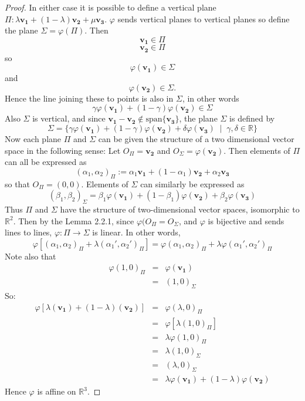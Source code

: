 \documentclass[honours]{UNSWthesis}
\newcommand{\R}{\mathbb{R}}
\newcommand{\1}{\mathbf{e}_{1}}
\newcommand{\2}{\mathbf{e}_{3}}
\newcommand{\3}{\mathbf{e}_{3}}
\begin{document}
\begin{proof}
In either case it is possible to define a vertical plane $\Pi: \lambda \mathbf{v_{1}} + (1-\lambda) \mathbf{v_{2}} + \mu\mathbf{v_{3}}$. $\varphi$ sends vertical planes to vertical planes so define the plane $\Sigma = \varphi(\Pi)$. Then 
\[
\mathbf{v_{1}} \in \Pi
\]
\[
\mathbf{v_{2}} \in \Pi
\]
so 
\[
\varphi(\mathbf{v_{1}}) \in \Sigma
\]
and 
\[
\varphi(\mathbf{v_{2}}) \in \Sigma.
\]
Hence the line joining these to points is also in $\Sigma$, in other words
\[
\gamma \varphi(\mathbf{v_{1}}) + (1-\gamma)\varphi(\mathbf{v_{2}}) \in \Sigma
\]
Also $\Sigma$ is vertical, and since $\mathbf{v_{1}}-\mathbf{v_{2}} \notin \text{span}\{ \mathbf{v_{3}}\}$, the plane $\Sigma$ is defined by 
\[
\Sigma = \{ \gamma \varphi(\mathbf{v_{1}}) + (1-\gamma)\varphi(\mathbf{v_{2}}) + \delta \varphi(\mathbf{v_{3}}) \; \;|\;\; \gamma,\delta \in \R \}
\]
Now each plane $\Pi$ and $\Sigma$ can be given the structure of a two dimensional vector space in the following sense:
Let $O_{\Pi}=\mathbf{v_{2}}$ and $O_{\Sigma}= \varphi(\mathbf{v_{2}})$. Then elements of $\Pi$ can all be expressed as 
\[
(\alpha_{1}, \alpha_{2})_{\Pi}:= \alpha_{1}\mathbf{v_{1}}+(1-\alpha_{1})\mathbf{v_{2}} + \alpha_{2}\mathbf{v_{3}}
\]
so that $O_{\Pi}=(0,0)$. 
Elements of $\Sigma$ can similarly be expressed as
\[
(\beta_{1}, \beta_{2})_{\Sigma}= \beta_{1}\varphi(\mathbf{v_{1}})+(1-\beta_{1})\varphi(\mathbf{v_{2}}) + \beta_{2} \varphi (\mathbf{v_{3}})
\]
Thus $\Pi$ and $\Sigma$ have the structure of two-dimensional vector spaces, isomorphic to $\R^2$. Then by the Lemma 2.2.1, since $\varphi(O_{\Pi}=O_{\Sigma}$, and $\varphi$ is bijective and sends lines to lines, $\varphi:\Pi \longrightarrow \Sigma$ is linear. In other words, 
\[
\varphi[(\alpha_{1},\alpha_{2})_{\Pi}+\lambda(\alpha_{1}',\alpha_{2}')_{\Pi}]=\varphi(\alpha_{1},\alpha_{2})_{\Pi} + \lambda \varphi(\alpha_{1}',\alpha_{2}')_{\Pi}
\]
Note also that 
\begin{eqnarray*}
\varphi(1,0)_{\Pi}&=&\varphi(\mathbf{v_{1}}) \\
&=& (1,0)_{\Sigma}
\end{eqnarray*}
So:
\begin{eqnarray*}
\varphi[\lambda(\mathbf{v_{1}})+(1-\lambda)(\mathbf{v_{2}})] &=& \varphi(\lambda,0)_{\Pi} \\
&=& \varphi[\lambda(1,0)_{\Pi}] \\
&=& \lambda\varphi(1,0)_{\Pi} \\
&=& \lambda(1,0)_{\Sigma} \\
&=&(\lambda,0)_{\Sigma} \\
&=& \lambda\varphi(\mathbf{v_{1}})+(1-\lambda)\varphi(\mathbf{v_{2}})
\end{eqnarray*}
Hence $\varphi$ is affine on $\R^{3}$.
\end{proof}
\end{document}
